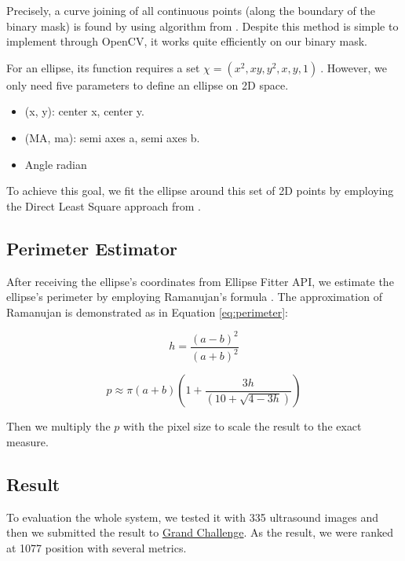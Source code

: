 	Precisely, a curve joining of all continuous points (along the boundary of the binary mask) is found by using algorithm from \cite{findContours}. Despite this method is simple to implement through OpenCV, it works quite efficiently on our binary mask.
	
	
	For an ellipse, its function requires a set $ \chi = (x^2, xy, y^2, x, y, 1)\ $. However, we only need five parameters to define an ellipse on 2D space. 
	
	\begin{itemize}
		\item (x, y): center x, center y.
		\item (MA, ma): semi axes a, semi axes b.
		\item Angle radian
	\end{itemize}
	
	To achieve this goal, we fit the ellipse around this set of 2D points by employing the Direct Least Square approach from \cite{direct_ellipse}.
	
\subsection{Perimeter Estimator}
\noindent
	
	After receiving the ellipse's coordinates from Ellipse Fitter API, we estimate the ellipse's perimeter by employing Ramanujan’s formula \cite{perimeter}. The approximation of Ramanujan is demonstrated as in Equation \eqref{eq:perimeter}:
	
	\[ h = \frac{(a-b)^2}{(a+b)^2} \]
	
	\[ p \approx \pi (a+b) (1 + \frac{3h}{(10 + \sqrt{4 - 3h})} ) \label{eq:perimeter} \]

\noindent
	Then we multiply the $p$ with the pixel size to scale the result to the exact measure.
	
\subsection{Result}
\noindent

	To evaluation the whole system, we tested it with 335 ultrasound images and then we submitted the result to  \href{https://hc18.grand-challenge.org/}{Grand Challenge}. As the result, we were ranked at 1077 position with several metrics.
	
